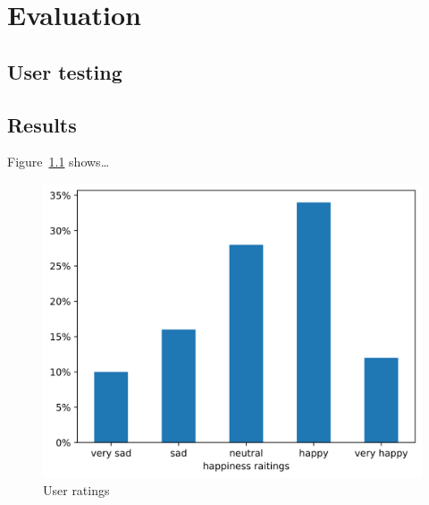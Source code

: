 \chapter{Evaluation}
\label{ch:evaluation}


\section{User testing}

\section{Results}

Figure~\ref{fig:user-ratings} shows…

\begin{figure}[H]
\centering
\includegraphics[width=.9\linewidth]{./figures/05-user-results}
% 
\caption{User ratings}
\label{fig:user-ratings}
\end{figure}
